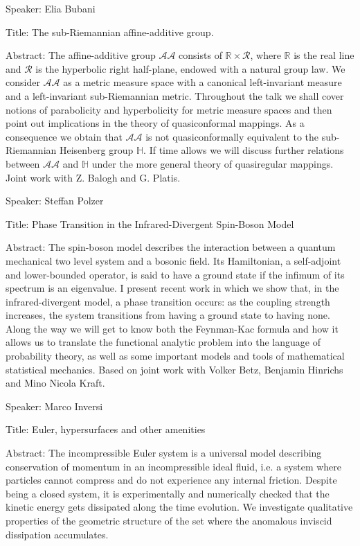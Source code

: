 Speaker: Elia Bubani

Title: The sub-Riemannian affine-additive group.

Abstract:
The affine-additive group $\mathcal{AA}$ consists of $\mathbb{R}\times\mathcal{R}$, where $\mathbb{R}$ is the real line and $\mathcal{R}$ is the hyperbolic right half-plane, endowed with a natural group law. We consider $\mathcal{AA}$ as a metric measure space with a canonical left-invariant measure and a left-invariant sub-Riemannian metric. Throughout the talk we shall cover notions of parabolicity and hyperbolicity for metric measure spaces and then point out implications in the theory of quasiconformal mappings. As a consequence we obtain that $\mathcal{AA}$ is not quasiconformally equivalent to the sub-Riemannian Heisenberg group $\mathbb{H}$. If time allows we will discuss further relations between $\mathcal{AA}$ and $\mathbb{H}$ under the more general theory of quasiregular mappings.\\
Joint work with Z. Balogh and G. Platis.


Speaker: Steffan Polzer

Title: Phase Transition in the Infrared-Divergent Spin-Boson Model

Abstract: The spin-boson model describes the interaction between a quantum mechanical two level system and a bosonic field. Its Hamiltonian, a self-adjoint and lower-bounded operator, is said to have a ground state if the infimum of its spectrum is an eigenvalue. I present recent work in which we show that, in the infrared-divergent model, a phase transition occurs: as the coupling strength increases, the system transitions from having a ground state to having none. Along the way we will get to know both the Feynman-Kac formula and how it allows us to translate the functional analytic problem into the language of probability theory, as well as some important models and tools of mathematical statistical mechanics. Based on joint work with Volker Betz, Benjamin Hinrichs and Mino Nicola Kraft. 


Speaker: Marco Inversi

Title: Euler, hypersurfaces and other amenities

Abstract: The incompressible Euler system is a universal model describing conservation of momentum in an incompressible ideal fluid, i.e. a system where particles cannot compress and do not experience any internal friction. Despite being a closed system, it is experimentally and numerically checked that the kinetic energy gets dissipated along the time evolution. We investigate qualitative properties of the geometric structure of the set where the anomalous inviscid dissipation accumulates.


